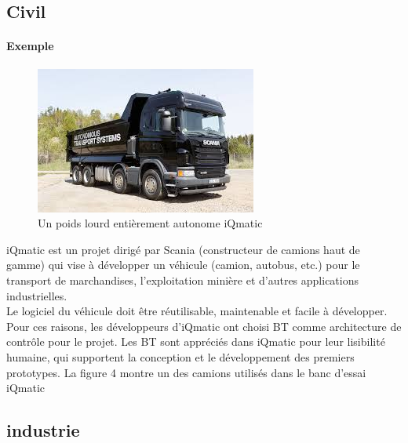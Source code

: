 \documentclass[titlepage]{article}
\begin{document}
		\subsection{Civil}
		\paragraph{Exemple}
		\begin{figure}[h!]
			\includegraphics[width=\linewidth]{img/vehicul.jpg}
			\caption{Un poids lourd entièrement autonome iQmatic}
			\label{fig:civil}
		\end{figure}	
		iQmatic est un projet dirigé par Scania (constructeur de camions haut de gamme) qui vise à développer un véhicule (camion, autobus, etc.) pour le transport de marchandises, l’exploitation minière et d’autres applications industrielles. 
		\\
		Le logiciel du véhicule doit être réutilisable, maintenable et facile à développer. Pour ces raisons, les développeurs d’iQmatic ont choisi BT comme architecture de contrôle pour le projet.
		Les BT sont appréciés dans iQmatic pour leur lisibilité humaine, qui supportent la conception et le développement des premiers prototypes. La figure 4 montre un des camions utilisés dans le banc d’essai iQmatic
		\subsection{industrie}
\end{document}
